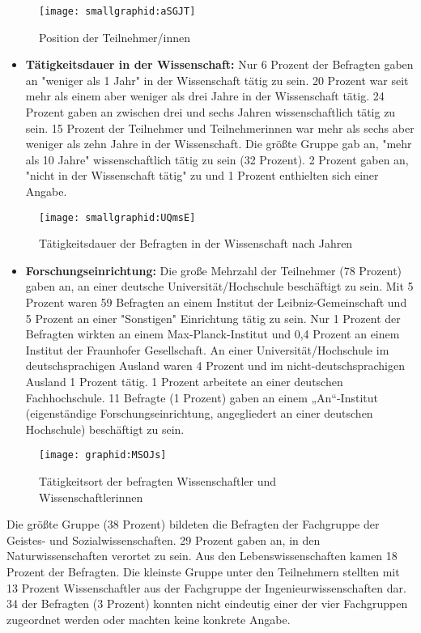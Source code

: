 \begin{figure}[h!]
\texttt{[image: smallgraphid:aSGJT]}
\caption{Position der Teilnehmer/innen}
\end{figure}

\begin{itemize}
\item \textbf{Tätigkeitsdauer in der Wissenschaft:} Nur 6 Prozent der Befragten gaben an "weniger als 1 Jahr" in der Wissenschaft tätig zu sein. 20 Prozent war seit mehr als einem aber weniger als drei Jahre in der Wissenschaft tätig. 24 Prozent gaben an zwischen drei und sechs Jahren wissenschaftlich tätig zu sein. 15 Prozent der Teilnehmer und Teilnehmerinnen war mehr als sechs aber weniger als zehn Jahre in der Wissenschaft. Die größte Gruppe gab an, "mehr als 10 Jahre" wissenschaftlich tätig zu sein (32 Prozent). 2 Prozent gaben an, "nicht in der Wissenschaft tätig" zu und 1 Prozent enthielten sich einer Angabe.
\end{itemize}

\begin{figure}[h!]
\texttt{[image: smallgraphid:UQmsE]}
\caption{Tätigkeitsdauer der Befragten in der Wissenschaft nach Jahren}
\end{figure}

\begin{itemize}
\item \textbf{Forschungseinrichtung:} Die große Mehrzahl der Teilnehmer (78 Prozent) gaben an, an einer deutsche Universität/Hochschule beschäftigt zu sein. Mit 5 Prozent waren 59 Befragten an einem Institut der Leibniz-Gemeinschaft und 5 Prozent an einer "Sonstigen" Einrichtung tätig zu sein. Nur 1 Prozent der Befragten wirkten an einem Max-Planck-Institut und 0,4 Prozent an einem Institut der Fraunhofer Gesellschaft. An einer Universität/Hochschule im deutschsprachigen Ausland waren 4 Prozent und im nicht-deutschsprachigen Ausland 1 Prozent tätig. 1 Prozent arbeitete an einer deutschen Fachhochschule. 11 Befragte (1 Prozent) gaben an einem „An“-Institut (eigenständige Forschungseinrichtung, angegliedert an einer deutschen Hochschule) beschäftigt zu sein.
\end{itemize}

\begin{figure}[h!]
\texttt{[image: graphid:MSOJs]}
\caption{Tätigkeitsort der befragten Wissenschaftler und Wissenschaftlerinnen}
\end{figure}

Die größte Gruppe (38 Prozent) bildeten die Befragten der Fachgruppe der Geistes- und Sozialwissenschaften. 29 Prozent gaben an, in den Naturwissenschaften verortet zu sein. Aus den Lebenswissenschaften kamen 18 Prozent der Befragten. Die kleinste Gruppe unter den Teilnehmern stellten mit 13 Prozent Wissenschaftler aus der Fachgruppe der Ingenieurwissenschaften dar. 34 der Befragten (3 Prozent) konnten nicht eindeutig einer der vier Fachgruppen zugeordnet werden oder machten keine konkrete Angabe.


